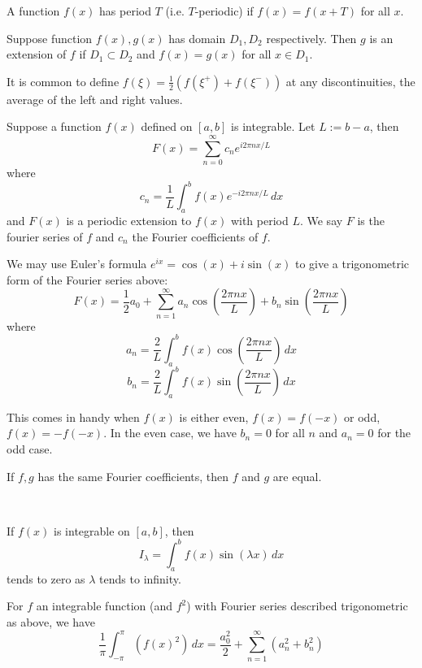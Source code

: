 \documentclass[11pt]{article}
\begin{document}
\begin{definition}
  A function \(f(x)\) has period \(T\) (i.e. \(T\)-periodic) if \(f(x)=f(x+T)\) for all \(x\).
\end{definition}
\begin{definition}[Extension]
  Suppose function \(f(x),g(x)\) has domain \(D_1,D_2\) respectively. Then \(g\) is an extension of \(f\) if \(D_1\subset D_2\) and \(f(x)=g(x)\) for all \(x\in D_1\).
\end{definition}
It is common to define \(f(\xi)=\frac{1}{2}(f(\xi^+)+f(\xi^-))\) at any discontinuities, the average of the left and right values.

\begin{theorem}
  Suppose a function \(f(x)\) defined on \([a,b]\) is integrable. Let \(L:=b-a\), then 
  \[F(x)=\sum_{n=0}^{\infty}c_n e^{i2\pi nx/L}\]
  where
  \[c_n=\frac{1}{L}\int_{a}^{b}f(x)e^{-i2\pi nx/L}\,dx\]
  and \(F(x)\) is a periodic extension to \(f(x)\) with period \(L\). We say \(F\) is the fourier series of \(f\) and \(c_n\) the Fourier coefficients of \(f\).
\end{theorem}

We may use Euler's formula \(e^{ix}=\cos(x)+i\sin(x)\) to give a trigonometric form of the Fourier series above:
\[F(x)=\frac{1}{2}a_0+\sum_{n=1}^{\infty}a_n\cos(\frac{2\pi nx}{L})+b_n\sin(\frac{2\pi nx}{L})\]
where
\[a_n=\frac{2}{L}\int_{a}^{b}f(x)\cos(\frac{2\pi nx}{L})\,dx\]
\[b_n=\frac{2}{L}\int_{a}^{b}f(x)\sin(\frac{2\pi nx}{L})\,dx\]

This comes in handy when \(f(x)\) is either even, \(f(x)=f(-x)\) or odd, \(f(x)=-f(-x)\). In the even case, we have \(b_n=0\) for all \(n\) and \(a_n=0\) for the odd case.

\begin{theorem}
  If \(f,g\) has the same Fourier coefficients, then \(f\) and \(g\) are equal.
\end{theorem}\

\begin{theorem}
  If \(f(x)\) is integrable on \([a,b]\), then
  \[I_\lambda = \int_{a}^{b}f(x)\sin(\lambda x)\,dx\]
  tends to zero as \(\lambda\) tends to infinity.
\end{theorem}

\begin{theorem}
  For \(f\) an integrable function (and \(f^2\)) with Fourier series described trigonometric as above, we have
  \[\frac{1}{\pi}\int_{-\pi}^{\pi}(f(x)^2)\,dx=\frac{a_0^2}{2}+\sum_{n=1}^{\infty}(a_n^2+b_n^2)\] 
\end{theorem}
\end{document}
